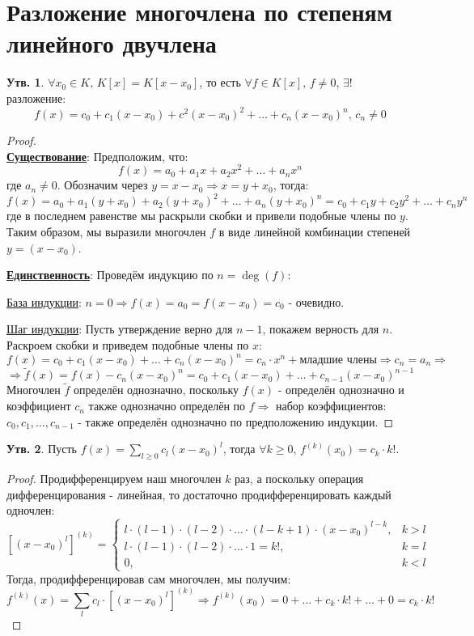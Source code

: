 \documentclass[12pt]{article}
\theoremstyle{definition}
\newtheorem{prop}{Утв.}
\newcommand{\ddsum}[2]{\displaystyle\sum\limits_{#1}^{#2}}
\newcommand{\wte}[1]{\widetilde{#1}}
\begin{document}
\section*{Разложение многочлена по степеням линейного двучлена}

\begin{prop}
	$\forall x_0 \in K, \, K[x] = K[x - x_0]$, то есть $\forall f \in K[x], \, f \neq 0, \, \exists !$ разложение: $$
		f(x) = c_0 + c_1(x - x_0) + c^2(x - x_0)^2 + \dotsc + c_n(x - x_0)^n, \, c_n \neq 0
	$$ 
\end{prop}
\begin{proof}\hfill\\
	\textbf{\uline{Существование}}: Предположим, что: 
	$$
		f(x) = a_0 + a_1x + a_2x^2 + \dotsc + a_n x^n
	$$ 
	где $a_n \neq 0$. Обозначим через $y = x - x_0 \Rightarrow x = y + x_0$, тогда:
	$$
		f(x) = a_0 + a_1(y + x_0) + a_2(y + x_0)^2 + \dotsc + a_n(y + x_0)^n = c_0 + c_1y + c_2 y^2 + \dotsc + c_ny^n
	$$
	где в последнем равенстве мы раскрыли скобки и привели подобные члены по $y$. Таким образом, мы выразили многочлен $f$ в виде линейной комбинации степеней $y= (x - x_0)$.
	
	\textbf{\uline{Единственность}}: Проведём индукцию по $n = \deg(f)$:
	
	\uline{База индукции}: $n = 0 \Rightarrow f(x) = a_0 = f(x - x_0) = c_0$ - очевидно. 
	
	\uline{Шаг индукции}: Пусть утверждение верно для $n-1$, покажем верность для $n$. Раскроем скобки и приведем подобные члены по $x$:
	$$
		f(x) = c_0 + c_1(x - x_0) + \dotsc + c_n(x - x_0)^n = c_n{\cdot}x^n + \text{младшие члены} \Rightarrow c_n = a_n \Rightarrow
	$$
	$$
		\Rightarrow \wte{f}(x) = f(x) - c_n(x - x_0)^n = c_0 + c_1(x - x_0) + \dotsc + c_{n-1}(x - x_0)^{n-1}
	$$
	Многочлен $\wte{f}$ определён однозначно, поскольку $f(x)$ - определён однозначно и коэффициент $c_n$ также однозначно определён по $f \Rightarrow$ набор коэффициентов: $c_0, c_1,\dotsc, c_{n-1}$ - также определён однозначно по предположению индукции.
\end{proof}
\newpage
\begin{prop}
	Пусть $f(x) = \ddsum{l \geq 0 }{}c_l(x - x_0)^l$, тогда  $\forall k \geq 0, \, f^{(k)}(x_0) = c_k{\cdot}k!$.
\end{prop}
\begin{proof}
	Продифференцируем наш многочлен $k$ раз, а поскольку операция дифференцирования - линейная, то достаточно продифференцировать каждый одночлен:
	$$
		\left[(x - x_0)^l\right]^{(k)} = 
		\begin{cases}
			l{\cdot}(l-1){\cdot}(l-2){\cdot}\dotsc{\cdot}(l - k +1){\cdot}(x - x_0)^{l - k}, & k > l\\
			l{\cdot}(l-1){\cdot}(l-2){\cdot}\dotsc{\cdot}1 = k!, & k = l\\
			0, & k < l
		\end{cases}
	$$
	Тогда, продифференцировав сам многочлен, мы получим:
	$$
		f^{(k)}(x) = \ddsum{l}{}c_l{\cdot}\left[(x - x_0)^l\right]^{(k)} \Rightarrow f^{(k)}(x_0) = 0 + \dotsc + c_k{\cdot}k! + \dotsc + 0 = c_k{\cdot}k!
	$$
\end{proof}
\end{document}
